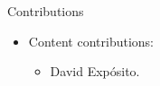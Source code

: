 \begin{frame}[t]{Contributions}
\begin{itemize}
  \item Content contributions:
    \begin{itemize}
      \item David Expósito.
    \end{itemize}
\end{itemize}
\end{frame}
